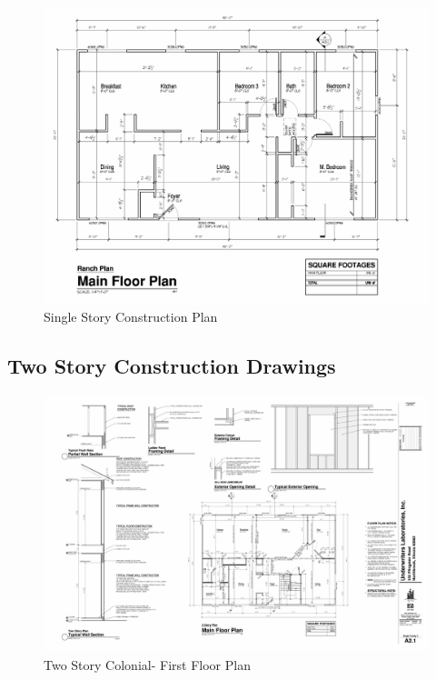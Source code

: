 \documentclass{article}
\begin{document}
\begin{appendices}
\begin{figure}
	\centering
	\includegraphics[width = 7.25in]{0_Images/Construction_Drawings/Ranch_Floor_Plan.pdf}
	\caption{Single Story Construction Plan}
\end{figure}

\clearpage
\subsection{Two Story Construction Drawings}

\begin{figure}
	\includegraphics[width=7.25in]{0_Images/Construction_Drawings/2_Story_Floor_Plan.pdf}
	\caption{Two Story Colonial- First Floor Plan}
\end{figure}


\end{appendices}
\end{document}
